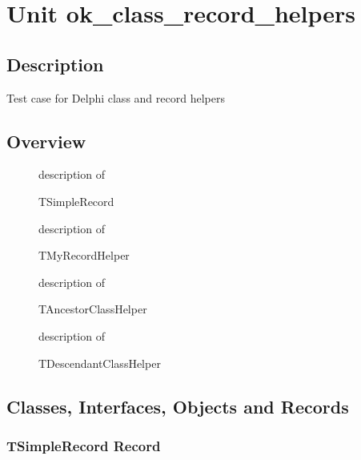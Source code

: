 \documentclass{report}
\newif\ifpdf
\begin{document}
\label{toc}\tableofcontents
\newpage
\newlength{\tmplength}
\chapter{Unit ok{\_}class{\_}record{\_}helpers}
\label{ok_class_record_helpers}
\section{Description}
Test case for Delphi class and record helpers
\section{Overview}
\begin{description}
\item[\texttt{\begin{ttfamily}TSimpleRecord\end{ttfamily} Record}]description of \begin{ttfamily}TSimpleRecord\end{ttfamily}
\item[\texttt{\begin{ttfamily}TMyRecordHelper\end{ttfamily} Record}]description of \begin{ttfamily}TMyRecordHelper\end{ttfamily}
\item[\texttt{\begin{ttfamily}TAncestorClassHelper\end{ttfamily} Class}]description of \begin{ttfamily}TAncestorClassHelper\end{ttfamily}
\item[\texttt{\begin{ttfamily}TDescendantClassHelper\end{ttfamily} Class}]description of \begin{ttfamily}TDescendantClassHelper\end{ttfamily}
\end{description}
\section{Classes, Interfaces, Objects and Records}
\ifpdf
\subsection*{\large{\textbf{TSimpleRecord Record}}\normalsize\hspace{1ex}\hrulefill}
\else
\end{document}
